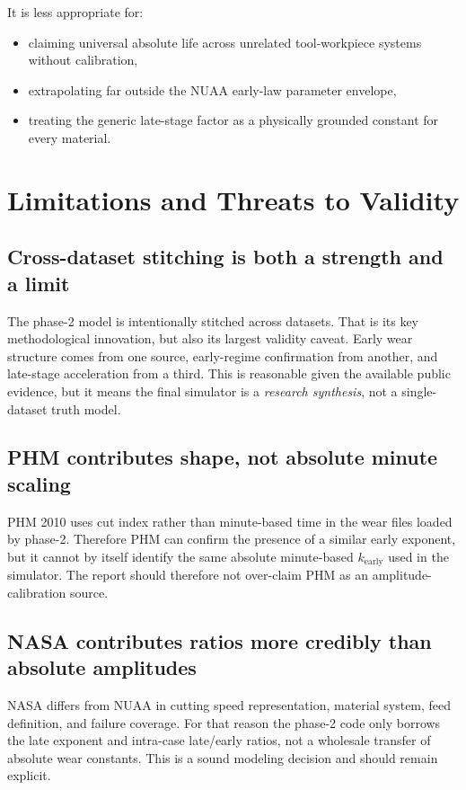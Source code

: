 \documentclass[11pt,a4paper]{article}
\begin{document}
It is less appropriate for:

\begin{itemize}[leftmargin=1.6em]
\item claiming universal absolute life across unrelated tool-workpiece systems without calibration,
\item extrapolating far outside the NUAA early-law parameter envelope,
\item treating the generic late-stage factor as a physically grounded constant for every material.
\end{itemize}

\section{Limitations and Threats to Validity}

\subsection{Cross-dataset stitching is both a strength and a limit}

The phase-2 model is intentionally stitched across datasets. That is its key methodological innovation, but also its
largest validity caveat. Early wear structure comes from one source, early-regime confirmation from another, and late-stage
acceleration from a third. This is reasonable given the available public evidence, but it means the final simulator is a
\emph{research synthesis}, not a single-dataset truth model.

\subsection{PHM contributes shape, not absolute minute scaling}

PHM 2010 uses cut index rather than minute-based time in the wear files loaded by phase-2. Therefore PHM can confirm
the presence of a similar early exponent, but it cannot by itself identify the same absolute minute-based \(k_{\mathrm{early}}\)
used in the simulator. The report should therefore not over-claim PHM as an amplitude-calibration source.

\subsection{NASA contributes ratios more credibly than absolute amplitudes}

NASA differs from NUAA in cutting speed representation, material system, feed definition, and failure coverage.
For that reason the phase-2 code only borrows the late exponent and intra-case late/early ratios, not a wholesale transfer
of absolute wear constants. This is a sound modeling decision and should remain explicit.
\end{document}
